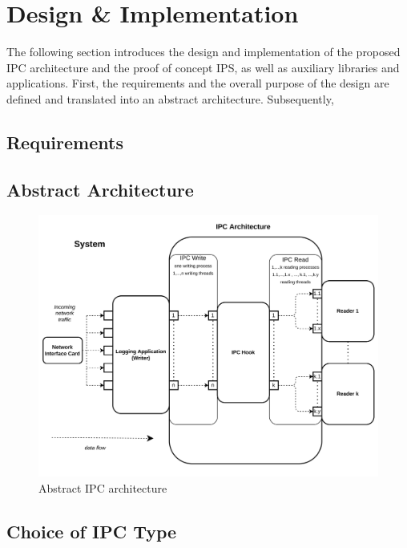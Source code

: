 %
%
\chapter{Design \& Implementation}
\label{sec:design}

The following section introduces the design and implementation of the proposed \ac{IPC} architecture and the proof of concept \ac{IPS}, as well as auxiliary libraries and applications.
First, the requirements and the overall purpose of the design are defined and translated into an abstract architecture. Subsequently,  

\section{Requirements}

\section{Abstract Architecture}

\begin{figure}[p]
    \caption[IPC Architecture]{Abstract \ac{IPC} architecture }
    \includegraphics[width=\textwidth]{images/meta_ipc_architecture.png}
\end{figure}

\section{Choice of IPC Type}

